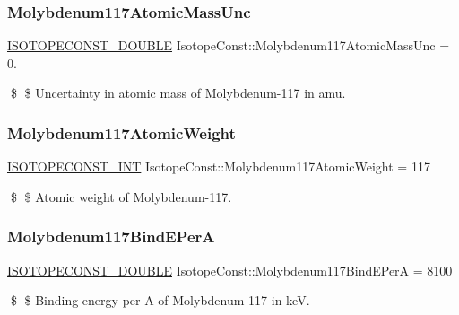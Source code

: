 \subsubsection{\texorpdfstring{Molybdenum117\+Atomic\+Mass\+Unc}{Molybdenum117AtomicMassUnc}}
{\footnotesize\ttfamily \mbox{\hyperlink{group___isotope_const-_macros_ga8f45a7272ce02c0b4c65c44636ed719a}{I\+S\+O\+T\+O\+P\+E\+C\+O\+N\+S\+T\+\_\+\+D\+O\+U\+B\+LE}} Isotope\+Const\+::\+Molybdenum117\+Atomic\+Mass\+Unc = 0.}

\$ \$ Uncertainty in atomic mass of Molybdenum-\/117 in amu. \mbox{\label{group___isotope_const-_molybdenum-_mo117_gaa947ca4b5ad0a588ba99d9106dc3569c}} 
\subsubsection{\texorpdfstring{Molybdenum117\+Atomic\+Weight}{Molybdenum117AtomicWeight}}
{\footnotesize\ttfamily \mbox{\hyperlink{group___isotope_const-_macros_ga5f18360b3e99483a35c32d789e62621c}{I\+S\+O\+T\+O\+P\+E\+C\+O\+N\+S\+T\+\_\+\+I\+NT}} Isotope\+Const\+::\+Molybdenum117\+Atomic\+Weight = 117}

\$ \$ Atomic weight of Molybdenum-\/117. \mbox{\label{group___isotope_const-_molybdenum-_mo117_ga964b63274d7a47ed44411023d170a6cf}} 
\subsubsection{\texorpdfstring{Molybdenum117\+Bind\+E\+PerA}{Molybdenum117BindEPerA}}
{\footnotesize\ttfamily \mbox{\hyperlink{group___isotope_const-_macros_ga8f45a7272ce02c0b4c65c44636ed719a}{I\+S\+O\+T\+O\+P\+E\+C\+O\+N\+S\+T\+\_\+\+D\+O\+U\+B\+LE}} Isotope\+Const\+::\+Molybdenum117\+Bind\+E\+PerA = 8100}

\$ \$ Binding energy per A of Molybdenum-\/117 in keV. \mbox{\label{group___isotope_const-_molybdenum-_mo117_ga98a3f04ed91c4f144552e1aedfebc881}} 
